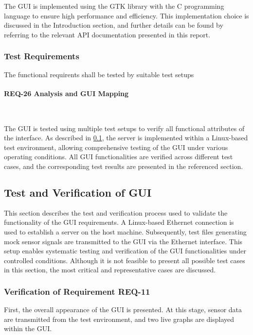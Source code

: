 The GUI is implemented using the GTK library with the C programming language to ensure 
high performance and efficiency. This implementation choice is discussed in the 
Introduction section, and further details can be found by referring to the relevant 
API documentation presented in this report.


\subsubsection{Test Requirements}

\begin{tcolorbox}[
    title=REQ-26,
    colback=gray!5,
    colframe=gray,
    fonttitle=\bfseries
]
The functional requirents shall be tested by suitable test setups
\end{tcolorbox}

\paragraph{REQ-26 Analysis and GUI Mapping}\

The GUI is tested using multiple test setups to verify all functional attributes of the 
interface. As described in \cref{subsection:asd}, the server is implemented within a Linux-based 
test environment, allowing comprehensive testing of the GUI under various operating 
conditions. All GUI functionalities are verified across different test cases, and the 
corresponding test results are presented in the referenced section.


\subsection{Test and Verification of GUI}
\label{subsection:asd}
This section describes the test and verification process used to validate the 
functionality of the GUI requirements. A Linux-based Ethernet connection is used to 
establish a server on the host machine. Subsequently, test files generating mock 
sensor signals are transmitted to the GUI via the Ethernet interface. This setup enables 
systematic testing and verification of the GUI functionalities under controlled 
conditions. Although it is not feasible to present all possible test cases in this 
section, the most critical and representative cases are discussed.

\subsubsection{Verification of Requirement REQ-11}
First, the overall appearance of the GUI is presented. At this stage, sensor data are 
transmitted from the test environment, and two live graphs are displayed within the GUI.


